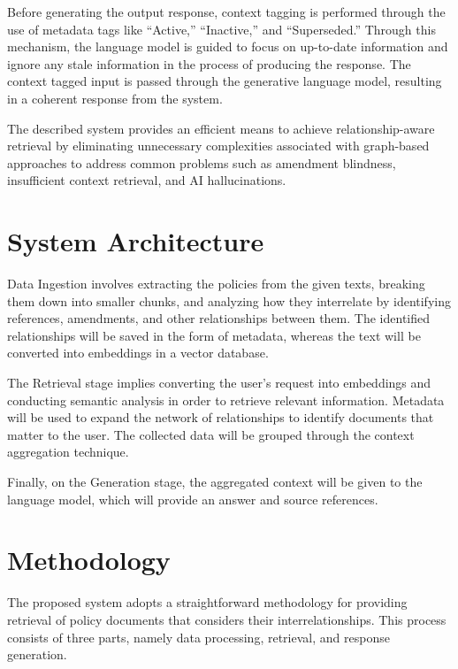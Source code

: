 \documentclass[conference]{IEEEtran}
\begin{document}
Before generating the output response, context tagging is performed through the use of metadata tags like ``Active,'' ``Inactive,'' and ``Superseded.'' Through this mechanism, the language model is guided to focus on up-to-date information and ignore any stale information in the process of producing the response. The context tagged input is passed through the generative language model, resulting in a coherent response from the system.

The described system provides an efficient means to achieve relationship-aware retrieval by eliminating unnecessary complexities associated with graph-based approaches to address common problems such as amendment blindness, insufficient context retrieval, and AI hallucinations.

\section{System Architecture}


Data Ingestion involves extracting the policies from the given texts, breaking them down into smaller chunks, and analyzing how they interrelate by identifying references, amendments, and other relationships between them. The identified relationships will be saved in the form of metadata, whereas the text will be converted into embeddings in a vector database.

The Retrieval stage implies converting the user's request into embeddings and conducting semantic analysis in order to retrieve relevant information. Metadata will be used to expand the network of relationships to identify documents that matter to the user. The collected data will be grouped through the context aggregation technique.

Finally, on the Generation stage, the aggregated context will be given to the language model, which will provide an answer and source references.

\section{Methodology}
The proposed system adopts a straightforward methodology for providing retrieval of policy documents that considers their interrelationships. This process consists of three parts, namely data processing, retrieval, and response generation.
\end{document}
